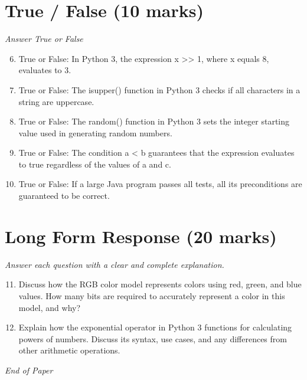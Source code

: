 \documentclass[12pt]{article}
\begin{document}
\section*{True / False (10 marks)}
\textit{Answer True or False}
\begin{enumerate}[label=\arabic*.]
\setcounter{enumi}{5}
\item True or False: In Python 3, the expression x \textgreater{}\textgreater{} 1, where x equals 8, evaluates to 3.
\item True or False: The isupper() function in Python 3 checks if all characters in a string are uppercase.
\item True or False: The random() function in Python 3 sets the integer starting value used in generating random numbers.
\item True or False: The condition a \textless{} b guarantees that the expression evaluates to true regardless of the values of a and c.
\item True or False: If a large Java program passes all tests, all its preconditions are guaranteed to be correct.
\end{enumerate}

\section*{Long Form Response (20 marks)}
\textit{Answer each question with a clear and complete explanation.}
\begin{enumerate}[label=\arabic*.]
\setcounter{enumi}{10}
\item Discuss how the RGB color model represents colors using red, green, and blue values. How many bits are required to accurately represent a color in this model, and why?
\item Explain how the exponential operator in Python 3 functions for calculating powers of numbers. Discuss its syntax, use cases, and any differences from other arithmetic operations.
\end{enumerate}

\vfill
\noindent\textit{End of Paper}
\end{document}
